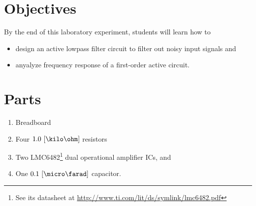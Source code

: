 \section{Objectives}
By the end of this laboratory experiment, students will learn how to 

\begin{itemize}
\item design an active lowpass filter circuit to filter out noisy input signals and 
  
\item anyalyze frequency response of a first-order active circuit.  

\end{itemize}

\section{Parts}
\label{sec:partsEx10}

\begin{enumerate}
\item Breadboard  
\item Four $1.0~[\kilo\ohm]$ resistors
\item Two LMC6482\footnote{See its datasheet at \href{http://www.ti.com/lit/ds/symlink/lmc6482.pdf}{http://www.ti.com/lit/ds/symlink/lmc6482.pdf}} dual operational amplifier ICs, and   
\item One $0.1~[\micro\farad]$ capacitor.
  
\end{enumerate}

